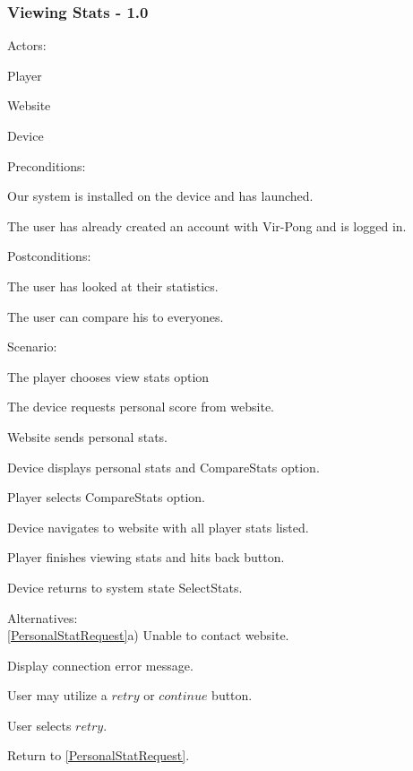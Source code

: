 \documentclass[12pt]{article}
\newenvironment{itemize*}%
  {\begin{itemize}%
  	\setlength{\parsep}{0pt}
    \setlength{\itemsep}{0pt}%
    \setlength{\parskip}{0pt}}%
  {\end{itemize}}
\newenvironment{enumerate*}%
  {\begin{enumerate}%
  	\setlength{\parsep}{0pt}
    \setlength{\itemsep}{0pt}%
    \setlength{\parskip}{0pt}}%
  {\end{enumerate}}
\begin{document}
\subsubsection*{Viewing Stats - 1.0}
Actors:
\begin{itemize*}
\item Player
\item Website
\item Device
\end{itemize*}
Preconditions:
\begin{itemize*}
\item Our system is installed on the device and has launched.
\item The user has already created an account with Vir-Pong and is logged in.
\end{itemize*}
Postconditions:
\begin{itemize*}
\item The user has looked at their statistics.
\item The user can compare his to everyones.
\end{itemize*}
Scenario:
\begin{enumerate*}
\item \label{SelectStats}The player chooses view stats option
\item \label{PersonalStatRequest}The device requests personal score from website.
\item Website sends personal stats.
\item Device displays personal stats and CompareStats option.
\item \label{CompareStats}Player selects CompareStats option.
\item Device navigates to website with all player stats listed.
\item \label{Back}Player finishes viewing stats and hits back button.
\item Device returns to system state SelectStats.
\end{enumerate*}
Alternatives:\\
\ref{PersonalStatRequest}a) Unable to contact website.
\begin{enumerate*}
\item Display connection error message.
\item User may utilize a $retry$ or $continue$ button.
\item User selects $retry$.
\item Return to \ref{PersonalStatRequest}.
\end{enumerate*}
\end{document}
